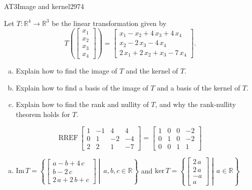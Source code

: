 \begin{exercise}{AT3}{Image and kernel}{2974} 
\begin{exerciseStatement} 

 Let \(T:\mathbb{R}^4 \to \mathbb{R}^3\) be the linear transformation given by \[T\left( \left[\begin{array}{c}
x_{1} \\
x_{2} \\
x_{3} \\
x_{4}
\end{array}\right] \right) = \left[\begin{array}{c}
x_{1} - x_{2} + 4 \, x_{3} + 4 \, x_{4} \\
x_{2} - 2 \, x_{3} - 4 \, x_{4} \\
2 \, x_{1} + 2 \, x_{2} + x_{3} - 7 \, x_{4}
\end{array}\right].\] 

 

\begin{enumerate}[(a)]
\item Explain how to find the image of \(T\) and the kernel of \(T\).
\item Explain how to find a basis of the image of \(T\) and a basis of the kernel of \(T\).
\item Explain how to find the rank and nullity of \(T\), and why the rank-nullity theorem holds for \(T\).
\end{enumerate}

     \end{exerciseStatement}
 \begin{exerciseAnswer} 

\[\mathrm{RREF}\,\left[\begin{array}{cccc}
1 & -1 & 4 & 4 \\
0 & 1 & -2 & -4 \\
2 & 2 & 1 & -7
\end{array}\right]=\left[\begin{array}{cccc}
1 & 0 & 0 & -2 \\
0 & 1 & 0 & -2 \\
0 & 0 & 1 & 1
\end{array}\right]\]

 

\begin{enumerate}[(a)]
\item  

 \(\mathrm{Im}\,T =  \left\{ \left[\begin{array}{c}
a - b + 4 \, c \\
b - 2 \, c \\
2 \, a + 2 \, b + c
\end{array}\right] \middle|\,a,b,c\in\mathbb{R}\right\}\) and \(\mathrm{ker}\,T = \left\{ \left[\begin{array}{c}
2 \, a \\
2 \, a \\
-a \\
a
\end{array}\right] \middle|\,a\in\mathbb{R}\right\}\) 


\end{enumerate}
\end{exerciseAnswer}
\end{exercise}
